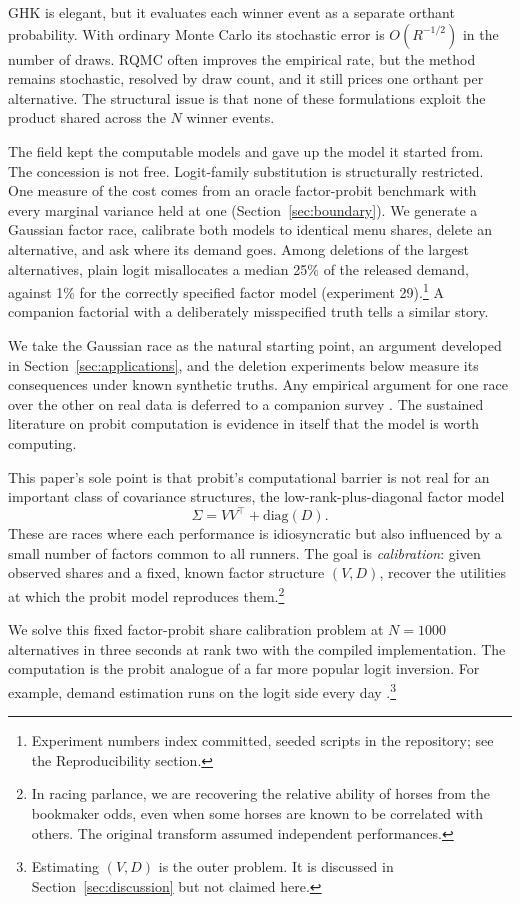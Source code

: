 \documentclass[12pt]{article}
\theoremstyle{remark}
\begin{document}
GHK is elegant, but it evaluates each winner event as a separate
orthant probability. With ordinary Monte Carlo its stochastic error is
$O(R^{-1/2})$ in the number of draws. RQMC often improves the empirical
rate, but the method remains stochastic, resolved by draw count, and it
still prices one orthant per alternative. The structural issue is that
none of these formulations exploit the product shared across the $N$
winner events.

The field kept the
computable models and gave up the model it started from. The concession
is not free. Logit-family substitution is structurally
restricted. One measure of the cost comes from an oracle factor-probit
benchmark with every marginal variance held at one
(Section~\ref{sec:boundary}). We generate a Gaussian factor race,
calibrate both models to identical menu shares, delete an alternative,
and ask where its demand goes. Among deletions of the largest
alternatives, plain logit misallocates a median 25\% of the released
demand, against 1\% for the correctly specified factor model
(experiment 29).\footnote{Experiment numbers index committed, seeded
scripts in the repository; see the Reproducibility section.} A companion factorial with a deliberately misspecified
truth tells a similar story.

We take the Gaussian race as the natural starting point, an argument
developed in Section~\ref{sec:applications}, and the deletion experiments below measure
its consequences under known synthetic truths. Any empirical argument for one race over the other on
real data is deferred to a companion survey \citep{cottonsurvey}. The
sustained literature on probit computation is evidence in itself that
the model is worth computing.

This paper's sole point is that probit's computational barrier is not real for an important
class of covariance structures, the low-rank-plus-diagonal factor model
\[
\Sigma = VV^\top + \mathrm{diag}(D).
\]
These are races where each
performance is idiosyncratic but also influenced by a small number of
factors common to all runners. The goal is \emph{calibration}: given
observed shares and a fixed, known factor structure $(V, D)$, recover the
utilities at which the probit model reproduces them.\footnote{In racing
parlance, we are recovering the relative ability of horses from the
bookmaker odds, even when some horses are known to be correlated with
others. The original transform \citep{cotton2021} assumed independent
performances.} 

We solve this fixed factor-probit share calibration problem at $N = 1000$ alternatives
in three seconds at rank two with the compiled implementation. The computation is the probit analogue of a far more popular logit inversion. For example, 
demand estimation runs on the logit side every day \citep{berry1995,conlon2020}.\footnote{Estimating $(V, D)$ is the outer problem. It is discussed in
Section~\ref{sec:discussion} but not claimed here.} 
\end{document}
